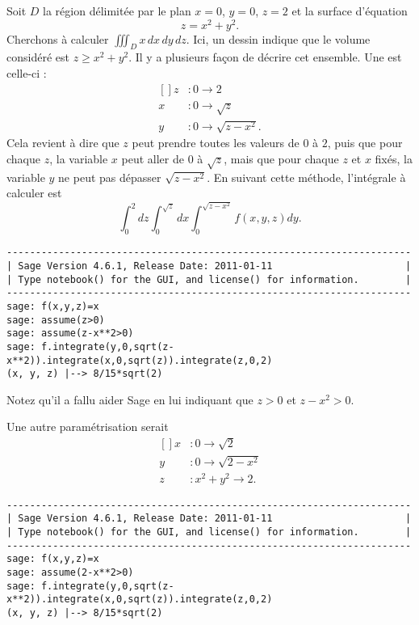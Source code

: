 \begin{example}
    Soit $D$ la région délimitée par le plan $x=0$, $y=0$, $z=2$ et la surface d'équation
    \begin{equation}
        z=x^2+y^2.
    \end{equation}
    Cherchons à calculer $\iiint_Dx\,dx\,dy\,dz$. Ici, un dessin indique que le volume considéré est $z\geq x^2+y^2$. Il y a plusieurs façon de décrire cet ensemble. Une est celle-ci :
    \begin{equation}
        \begin{aligned}[]
            z&\colon 0\to 2\\
            x&\colon 0\to \sqrt{z}\\
            y&\colon 0\to \sqrt{z-x^2}.
        \end{aligned}
    \end{equation}
    Cela revient à dire que $z$ peut prendre toutes les valeurs de $0$ à $2$, puis que pour chaque $z$, la variable $x$ peut aller de $0$ à $\sqrt{z}$, mais que pour chaque $z$ et $x$ fixés, la variable $y$ ne peut pas dépasser $\sqrt{z-x^2}$. En suivant cette méthode, l'intégrale à calculer est
    \begin{equation}
        \int_0^2dz\int_0^{\sqrt{z}}dx\int_0^{\sqrt{z-x^2}}f(x,y,z)dy.
    \end{equation}
    \begin{verbatim}
----------------------------------------------------------------------
| Sage Version 4.6.1, Release Date: 2011-01-11                       |
| Type notebook() for the GUI, and license() for information.        |
----------------------------------------------------------------------
sage: f(x,y,z)=x
sage: assume(z>0)
sage: assume(z-x**2>0)
sage: f.integrate(y,0,sqrt(z-x**2)).integrate(x,0,sqrt(z)).integrate(z,0,2)
(x, y, z) |--> 8/15*sqrt(2)
    \end{verbatim}
    Notez qu'il a fallu aider Sage en lui indiquant que $z>0$ et $z-x^2>0$.

    Une autre paramétrisation serait
    \begin{equation}
        \begin{aligned}[]
            x&\colon 0\to \sqrt{2}\\
            y&\colon 0\to \sqrt{2-x^2}\\
            z&\colon x^2+y^2\to 2.
        \end{aligned}
    \end{equation}
    \begin{verbatim}
----------------------------------------------------------------------
| Sage Version 4.6.1, Release Date: 2011-01-11                       |
| Type notebook() for the GUI, and license() for information.        |
----------------------------------------------------------------------
sage: f(x,y,z)=x
sage: assume(2-x**2>0)
sage: f.integrate(y,0,sqrt(z-x**2)).integrate(x,0,sqrt(z)).integrate(z,0,2)
(x, y, z) |--> 8/15*sqrt(2)
    \end{verbatim}


\end{example}
